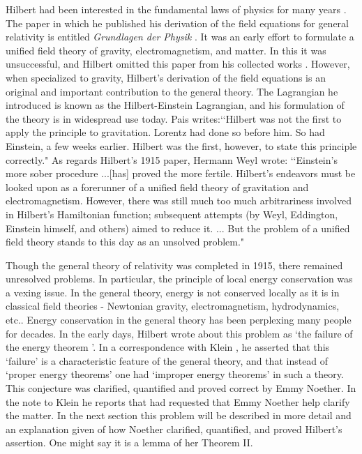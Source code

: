 \documentclass[12pt]{article}
\begin{document}
Hilbert had been interested in the fundamental laws of physics for many years \cite{reid}.
The paper in which he published his derivation of the field equations for general relativity
is entitled {\it{Grundlagen der Physik}} \cite{hilbert}.  It was an early effort to formulate
a unified field theory of gravity, electromagnetism, and matter.  In this it was
unsuccessful, and Hilbert omitted this paper from his collected works \cite{hilbert1}.
However, when specialized to gravity, Hilbert's derivation of the field equations is an
original and important contribution to the general theory.  The Lagrangian he introduced is
known as the Hilbert-Einstein Lagrangian, and his formulation of the theory is in widespread
use today.  Pais writes:\lq\lq Hilbert was not the first to apply the principle to
gravitation.  Lorentz had done so before him.  So had Einstein, a few weeks earlier.  Hilbert
was the first, however, to state this principle correctly."  As regards Hilbert's 1915 paper,
Hermann Weyl \cite{reid} wrote:  \lq\lq Einstein's more sober procedure ...[has] proved the
more fertile.  Hilbert's endeavors must be looked upon as a forerunner of a unified field
theory of gravitation and electromagnetism.  However, there was still much too much
arbitrariness involved in Hilbert's Hamiltonian function; subsequent attempts (by Weyl,
Eddington, Einstein himself, and others) aimed to reduce it.  ...  But the problem of a
unified field theory stands to this day as an unsolved problem."



Though the general theory of relativity was completed in 1915, there remained unresolved
problems.  In particular, the principle of local energy conservation was a vexing issue.  In the general theory, energy
is not conserved locally as it is in classical field theories - Newtonian gravity,
electromagnetism, hydrodynamics, etc..  Energy conservation in the general theory has been
perplexing many people for decades.  In the early days, Hilbert wrote about 
this problem as \lq the
failure of the energy theorem '. In a correspondence with Klein \cite{klein}, 
he asserted that this `failure' is  a characteristic feature of the general
theory, and that instead of `proper energy theorems' one had
`improper energy theorems' in such a theory. This conjecture was clarified,
quantified and proved correct by Emmy Noether.  In the note to Klein 
he reports that had requested that Emmy Noether help 
clarify the matter. In the next section this problem will be
described in
more detail and an explanation given of how Noether clarified, quantified, and
proved Hilbert's assertion. One might say it is a lemma of her Theorem II. 
\end{document}
